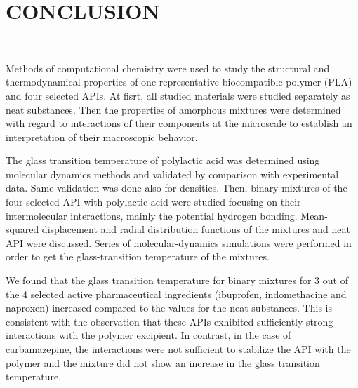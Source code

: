 \clearpage
\section{CONCLUSION}
\

Methods of computational chemistry were used to study the structural and thermodynamical properties of one representative biocompatible polymer (PLA) and four selected APIs. At fisrt, all studied materials were studied separately as neat substances. Then the properties of amorphous mixtures were determined with regard to interactions of their components at the microscale to establish an interpretation of their macroscopic behavior. 

The glass transition temperature of polylactic acid was determined using molecular dynamics methods and validated by comparison with experimental data. Same validation was done also for densities. Then, binary mixtures of the four selected API with polylactic acid were studied focusing on their intermolecular interactions, mainly the potential hydrogen bonding. Mean-squared displacement and radial distribution functions of the mixtures and neat API were discussed. Series of molecular-dynamics simulations were performed in order to get the glass-transition temperature of the mixtures.

We found that the glass transition temperature for binary mixtures for 3 out of the 4 selected active pharmaceutical ingredients (ibuprofen, indomethacine and naproxen) increased compared to the values for the neat substances. This is consistent with the observation that these APIs exhibited sufficiently strong interactions with the polymer excipient. In contrast, in the case of carbamazepine, the interactions were not sufficient to stabilize the API with the polymer and the mixture did not show an increase in the glass transition temperature. 
